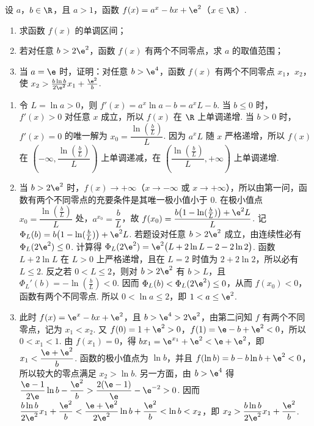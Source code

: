 \begin{problem}
设 \(a\)，\(b\in\R\)，且 \(a>1\)，函数 \(f(x)=a^x-bx+\e^2\)（\(x\in\R\)）.

\begin{enumerate}
\item 求函数 \(f(x)\) 的单调区间；

\item 若对任意 \(b>2\e^2\)，函数 \(f(x)\) 有两个不同零点，求 \(a\) 的取值范围；

\item 当 \(a=\e\) 时，证明：对任意 \(b>\e^4\)，函数 \(f(x)\) 有两个不同零点 \(x_1\)，\(x_2\)，使 \(x_2>\frac{b\ln b}{2\e^2}x_1+\frac{\e^2}{b}\).
\end{enumerate}
\end{problem}

\begin{solution}
\begin{enumerate}
\item 令 \(L=\ln a>0\)，则
\(f'(x)=a^{x}\ln a-b=a^{x}L-b\).
当 \(b\leq0\) 时，\(f'(x)>0\) 对任意 \(x\) 成立，所以 \(f(x)\) 在 \(\R\) 上单调递增.
当 \(b>0\) 时，\(f'(x)=0\) 的唯一解为 \(x_0=\dfrac{\ln(\frac{b}{L})}{L}\). 因为 \(a^{x}L\) 随 \(x\) 严格递增，所以 \(f(x)\) 在 \(\left(-\infty,\dfrac{\ln(\frac{b}{L})}{L}\right)\) 上单调递减，在 \(\left(\dfrac{\ln(\frac{b}{L})}{L},+\infty\right)\) 上单调递增.

\item 当 \(b>2\e^2\) 时，\(f(x)\to+\infty\)（\(x\to-\infty\) 或 \(x\to+\infty\)），所以由第一问，函数有两个不同零点的充要条件是其唯一极小值小于 \(0\). 在极小值点 \(x_0=\dfrac{\ln(\frac{b}{L})}{L}\) 处，\(a^{x_0}=\dfrac bL\)，故
\(f(x_0)=\dfrac{b\bigl(1-\ln(\frac{b}{L})\bigr)+\e^2L}{L}\).
记 \(\Phi_L(b)=b\bigl(1-\ln(\frac{b}{L})\bigr)+\e^2L\). 若题设对任意 \(b>2\e^2\) 成立，由连续性必有 \(\Phi_L(2\e^2)\leq0\). 计算得
\(\Phi_L(2\e^2)=\e^2\bigl(L+2\ln L-2-2\ln2\bigr)\).
函数 \(L+2\ln L\) 在 \(L>0\) 上严格递增，且在 \(L=2\) 时值为 \(2+2\ln2\)，所以必有 \(L\leq2\).
反之若 \(0<L\leq2\)，则对 \(b>2\e^2\) 有 \(b>L\)，且
\(\Phi_L'(b)=-\ln(\frac{b}{L})<0\). 因而
\(\Phi_L(b)<\Phi_L(2\e^2)\leq0\)，从而 \(f(x_0)<0\)，函数有两个不同零点. 所以 \(0<\ln a\leq2\)，即 \(1<a\leq\e^2\).

\item 此时 \(f(x)=\e^x-bx+\e^2\)，且 \(b>\e^4>2\e^2\)，由第二问知 \(f\) 有两个不同零点，记为 \(x_1<x_2\). 又
\(f(0)=1+\e^2>0\)，\(f(1)=\e-b+\e^2<0\)，所以 \(0<x_1<1\). 由 \(f(x_1)=0\)，得
\(bx_1=\e^{x_1}+\e^2<\e+\e^2\)，即 \(x_1<\dfrac{\e+\e^2}{b}\).
函数的极小值点为 \(\ln b\)，并且
\(f(\ln b)=b-b\ln b+\e^2<0\)，所以较大的零点满足 \(x_2>\ln b\).
另一方面，由 \(b>\e^4\) 得
\(\dfrac{\e-1}{2\e}\ln b-\dfrac{\e^2}{b}>\dfrac{2(\e-1)}{\e}-\e^{-2}>0\). 因而
\(\dfrac{b\ln b}{2\e^2}x_1+\dfrac{\e^2}{b}<\dfrac{\e+\e^2}{2\e^2}\ln b+\dfrac{\e^2}{b}<\ln b<x_2\)，即
\(x_2>\dfrac{b\ln b}{2\e^2}x_1+\dfrac{\e^2}{b}\).
\end{enumerate}
\end{solution}
